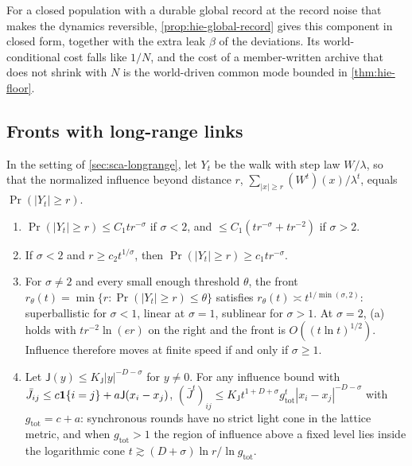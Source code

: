 For a closed population with a durable global record at the record noise that makes the dynamics reversible, \cref{prop:hie-global-record} gives this component in closed form, together with the extra leak $\beta$ of the deviations. Its world-conditional cost falls like $1/N$, and the cost of a member-written archive that does not shrink with $N$ is the world-driven common mode bounded in \cref{thm:hie-floor}.

\subsection{Fronts with long-range links}\label{sup:sca-fronts-with-long-range-links}

\begin{proposition}[Fronts]\label{prop:sca-fronts}
In the setting of \cref{sec:sca-longrange}, let $Y_t$ be the walk with step law $W/\lambda$, so that the normalized influence beyond distance $r$, $\sum_{|x|\ge r}(W^t)(x)/\lambda^t$, equals $\Pr(|Y_t|\ge r)$.
\begin{enumerate}
\item[(a)] $\Pr(|Y_t|\ge r)\le C_1tr^{-\sigma}$ if $\sigma<2$, and $\le C_1(tr^{-\sigma}+tr^{-2})$ if $\sigma>2$.
\item[(b)] If $\sigma<2$ and $r\ge c_2t^{1/\sigma}$, then $\Pr(|Y_t|\ge r)\ge c_1tr^{-\sigma}$.
\item[(c)] For $\sigma\neq2$ and every small enough threshold $\theta$, the front $r_\theta(t)=\min\{r:\Pr(|Y_t|\ge r)\le\theta\}$ satisfies $r_\theta(t)\asymp t^{1/\min(\sigma,2)}$: superballistic for $\sigma<1$, linear at $\sigma=1$, sublinear for $\sigma>1$. At $\sigma=2$, (a) holds with $tr^{-2}\ln(er)$ on the right and the front is $O((t\ln t)^{1/2})$. Influence therefore moves at finite speed if and only if $\sigma\ge1$.
\item[(d)] Let $\mathsf J(y)\le K_{\mathsf J}|y|^{-D-\sigma}$ for $y\neq0$. For any influence bound with $\bar J_{ij}\le c\mathbf{1}\{i=j\}+a\mathsf J(x_i-x_j)$, $(\bar J^t)_{ij}\le K_{\mathsf J}t^{1+D+\sigma}g_{\mathrm{tot}}^t|x_i-x_j|^{-D-\sigma}$ with $g_{\mathrm{tot}}=c+a$: synchronous rounds have no strict light cone in the lattice metric, and when $g_{\mathrm{tot}}>1$ the region of influence above a fixed level lies inside the logarithmic cone $t\gtrsim(D+\sigma)\ln r/\ln g_{\mathrm{tot}}$.
\end{enumerate}
\end{proposition}
